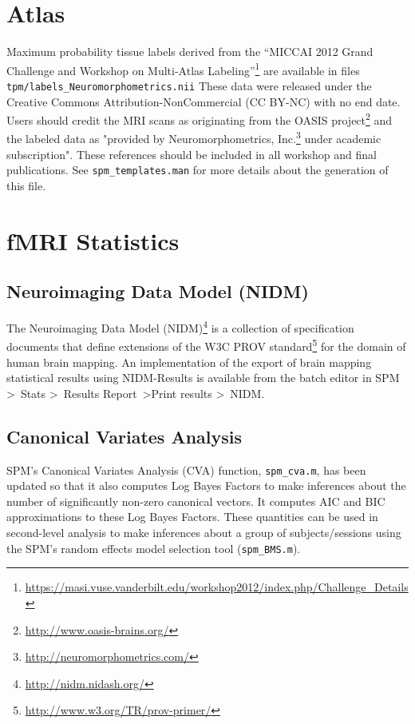 \documentclass[a4paper,titlepage,openany]{article}
\begin{document}
\section{Atlas}

Maximum probability tissue labels derived from the ``MICCAI 2012 Grand Challenge and Workshop on Multi-Atlas Labeling''\footnote{\url{https://masi.vuse.vanderbilt.edu/workshop2012/index.php/Challenge_Details}} are available in files \texttt{tpm/labels\_Neuromorphometrics.nii}
These data were released under the Creative Commons Attribution-NonCommercial (CC BY-NC) with no end date. Users should credit the MRI scans as originating from the OASIS project\footnote{\url{http://www.oasis-brains.org/}} and the labeled data as "provided by Neuromorphometrics, Inc.\footnote{\url{http://neuromorphometrics.com/}} under academic subscription". These references should be included in all workshop and final publications.
See \texttt{spm\_templates.man} for more details about the generation of this file.

\section{fMRI Statistics}

\subsection{Neuroimaging Data Model (NIDM)}

The Neuroimaging Data Model (NIDM)\footnote{\url{http://nidm.nidash.org/}} is a collection of specification documents that define extensions of the W3C PROV standard\footnote{\url{http://www.w3.org/TR/prov-primer/}} for the domain of human brain mapping.
An implementation of the export of brain mapping statistical results using NIDM-Results \cite{Maumet2014} is available from the batch editor in SPM \textgreater\ Stats \textgreater\ Results Report\ \textgreater Print results \textgreater\ NIDM.

\subsection{Canonical Variates Analysis}

SPM's Canonical Variates Analysis (CVA) function, \texttt{spm\_cva.m}, has been updated so that it also computes Log Bayes Factors to make inferences about the number of significantly non-zero canonical vectors. It computes AIC and BIC approximations to these Log Bayes Factors. These quantities can be used in second-level analysis to make inferences about a group of subjects/sessions using the SPM's random effects model selection tool (\texttt{spm\_BMS.m}).
\end{document}
